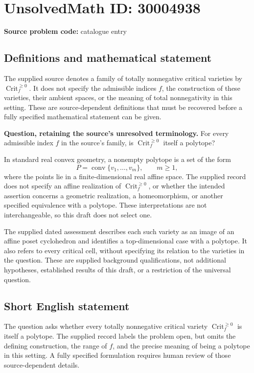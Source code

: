 \documentclass[11pt]{article}
\begin{document}
\section*{UnsolvedMath ID: 30004938}
\textbf{Source problem code:} catalogue entry
\subsection{Definitions and mathematical statement}
The supplied source denotes a family of totally nonnegative critical varieties by \(\operatorname{Crit}^{\geq 0}_f\). It does not specify the admissible indices \(f\), the construction of these varieties, their ambient spaces, or the meaning of total nonnegativity in this setting. These are source-dependent definitions that must be recovered before a fully specified mathematical statement can be given.

\textbf{Question, retaining the source's unresolved terminology.} For every admissible index \(f\) in the source's family, is \(\operatorname{Crit}^{\geq 0}_f\) itself a polytope?

In standard real convex geometry, a nonempty polytope is a set of the form
\[
P=\operatorname{conv}\{v_1,\ldots,v_m\},\qquad m\geq 1,
\]
where the points lie in a finite-dimensional real affine space. The supplied record does not specify an affine realization of \(\operatorname{Crit}^{\geq 0}_f\), or whether the intended assertion concerns a geometric realization, a homeomorphism, or another specified equivalence with a polytope. These interpretations are not interchangeable, so this draft does not select one.

The supplied dated assessment describes each such variety as an image of an affine poset cyclohedron and identifies a top-dimensional case with a polytope. It also refers to every critical cell, without specifying its relation to the varieties in the question. These are supplied background qualifications, not additional hypotheses, established results of this draft, or a restriction of the universal question.
\subsection{Short English statement}
The question asks whether every totally nonnegative critical variety \(\operatorname{Crit}^{\geq 0}_f\) is itself a polytope. The supplied record labels the problem open, but omits the defining construction, the range of \(f\), and the precise meaning of being a polytope in this setting. A fully specified formulation requires human review of those source-dependent details.
\end{document}
